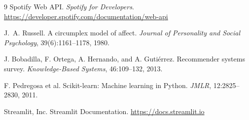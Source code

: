 \documentclass[11pt]{article}
\begin{document}
\begin{thebibliography}{9}
Spotify Web API. \emph{Spotify for Developers}. \url{https://developer.spotify.com/documentation/web-api}

J.~A. Russell.
A circumplex model of affect.
\emph{Journal of Personality and Social Psychology}, 39(6):1161--1178, 1980.

J. Bobadilla, F. Ortega, A. Hernando, and A. Guti\'errez.
Recommender systems survey.
\emph{Knowledge-Based Systems}, 46:109--132, 2013.

F. Pedregosa et al.
Scikit-learn: Machine learning in Python.
\emph{JMLR}, 12:2825--2830, 2011.

Streamlit, Inc. Streamlit Documentation. \url{https://docs.streamlit.io}
\end{thebibliography}
\end{document}

